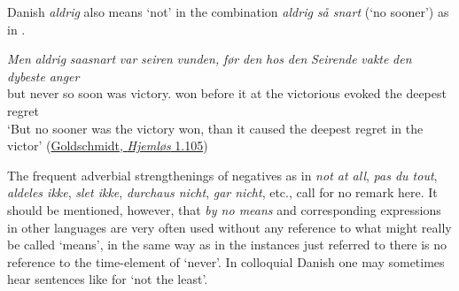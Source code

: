 \z{}

Danish \textit{aldrig} also means `not' in the combination \textit{aldrig så snart} (`no sooner') as in .

\ea \label{ex:02-46}
\gll \textit{Men} \textit{aldrig} \textit{saasnart} \textit{var} \textit{seiren} \textit{vunden,} \textit{før} \textit{den} \textit{hos} \textit{den} \textit{Seirende} \textit{vakte} \textit{den} \textit{dybeste} \textit{anger}\\
 but never {so soon} was victory.\DEF{} won before it at the victorious evoked the deepest regret\\
\glt `But no sooner was the victory won, than it caused the deepest regret in the victor'
\hfill(\href{https://tekster.kb.dk/text/adl-texts-goldschmidt03-root}{Goldschmidt, \textit{Hjemløs} 1.105}) %
\z{}

The frequent adverbial strengthenings of negatives as in \textit{not at all}, \textit{pas du tout}, \textit{aldeles ikke}, \textit{slet ikke}, \textit{durchaus nicht}, \textit{gar nicht}, etc., call for no remark here. It should be mentioned, however, that \textit{by no means} and corresponding expressions in other languages are very often used without any reference to what might really be called `means', in the same way as in the instances just referred to there is no reference to the time-element of `never'. In colloquial Danish one may sometimes hear sentences like  for `not the least'.


